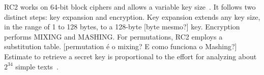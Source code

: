 
RC2 works on 64-bit block ciphers and allows a variable key size~\cite{rivest1998description}. %
It follows two distinct steps: key expansion and encryption. Key expansion extends any key size, in the range of 1 to 128 bytes, to a 128-{\color{blue}byte [byte mesmo?]} key. Encryption performs MIXING and MASHING. {\color{blue}For permutations, RC2 employs %
a substitution table. [permutation é o mixing? E como funciona o Mashing?]} Estimate to retrieve a secret key is proportional to the effort for analyzing about $2^{34}$ simple texts~\cite{knudsen1998design}.


